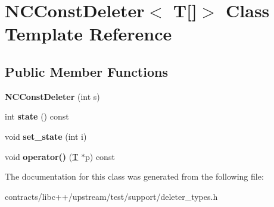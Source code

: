 \hypertarget{class_n_c_const_deleter_3_01_t[]_4}{}\section{N\+C\+Const\+Deleter$<$ T\mbox{[}\mbox{]}$>$ Class Template Reference}
\label{class_n_c_const_deleter_3_01_t[]_4}
\subsection*{Public Member Functions}
\begin{DoxyCompactItemize}
\item 
\mbox{\label{class_n_c_const_deleter_3_01_t[]_4_a0e9be74997775f335b68557a509ea542}} 
{\bfseries N\+C\+Const\+Deleter} (int s)
\item 
\mbox{\label{class_n_c_const_deleter_3_01_t[]_4_a503e398b0b1ed5eab71e3055ee42f556}} 
int {\bfseries state} () const
\item 
\mbox{\label{class_n_c_const_deleter_3_01_t[]_4_ad2da75284feaaf12ade5bdc704029e28}} 
void {\bfseries set\+\_\+state} (int i)
\item 
\mbox{\label{class_n_c_const_deleter_3_01_t[]_4_a03db993bbb0a164f5b5daf038f64184e}} 
void {\bfseries operator()} (\mbox{\hyperlink{struct_t}{T}} $\ast$p) const
\end{DoxyCompactItemize}


The documentation for this class was generated from the following file\+:\begin{DoxyCompactItemize}
\item 
contracts/libc++/upstream/test/support/deleter\+\_\+types.\+h\end{DoxyCompactItemize}
